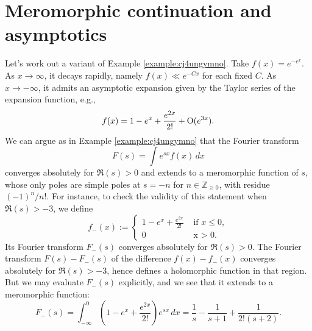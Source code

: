 \documentclass[reqno]{amsart} 
\begin{document}
\section{Meromorphic continuation and asymptotics}\label{sec:cj4vkf4yvq}


\begin{example}\label{example:cj4uniw25n}
  Let's work out a variant of Example \ref{example:cj4ungymno}.  Take $f(x) = e^{- e^x}$.  As $x \rightarrow \infty$, it decays rapidly, namely $f(x) \ll e^{-C x}$ for each fixed $C$.  As $x \rightarrow -\infty$, it admits an asymptotic expansion given by the Taylor series of the expansion function, e.g.,
  \begin{equation*}
f(x) = 1 - e^{x} + \frac{e^{2 x}}{2!} + \operatorname{O} (e^{3 x}).
  \end{equation*}
  We can argue as in Example \ref{example:cj4ungymno} that the Fourier transform
  \begin{equation*}
F(s) = \int e^{s x } f(x) \, d x
  \end{equation*}
  converges absolutely for $\Re(s) > 0$ and extends to a meromorphic function of $s$, whose only poles are simple poles at $s = -n$ for $n \in \mathbb{Z}_{\geq 0}$, with residue $(-1)^n / n!$.  For instance, to check the validity of this statement when $\Re(s) > -3$, we define
  \begin{equation*}
f_-(x) :=
\begin{cases}
1 - e^x + \frac{e^{2 x }}{ 2 !} & \text{ if } x \leq 0, \\
0 & \text{ x > 0.}
\end{cases}
  \end{equation*}
  Its Fourier transform $F_-(s)$ converges absolutely for $\Re(s) > 0$.  The Fourier transform $F(s) - F_-(s)$ of the difference $f(x) - f_-(x)$ converges absolutely for $\Re(s) > -3$, hence defines a holomorphic function in that region.  But we may evaluate $F_-(s)$ explicitly, and we see that it extends to a meromorphic function:
  \begin{equation}\label{eq:cj4uni5pkc}
    F_-(s) = \int _{-\infty}^0 \left( 1 - e^x + \frac{e^{2 x }}{ 2!} \right) e^{s x} \, d x
    =
    \frac{1}{s} - \frac{1}{s + 1} + \frac{1}{2 ! (s + 2)}.
\end{equation}  
\end{example}
\end{document}
